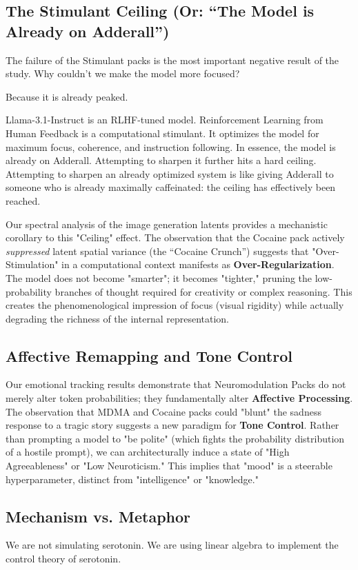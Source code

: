 \documentclass[10pt]{article}
\begin{document}
\subsection{The Stimulant Ceiling (Or: ``The Model is Already on Adderall'')}
The failure of the Stimulant packs is the most important negative result of the study. Why couldn't we make the model more focused?

Because it is already peaked.

Llama-3.1-Instruct is an RLHF-tuned model. Reinforcement Learning from Human Feedback is a computational stimulant. It optimizes the model for maximum focus, coherence, and instruction following. In essence, the model is already on Adderall. Attempting to sharpen it further hits a hard ceiling. Attempting to sharpen an already optimized system is like giving Adderall to someone who is already maximally caffeinated: the ceiling has effectively been reached.

Our spectral analysis of the image generation latents provides a mechanistic corollary to this "Ceiling" effect. The observation that the Cocaine pack actively \textit{suppressed} latent spatial variance (the ``Cocaine Crunch'') suggests that "Over-Stimulation" in a computational context manifests as \textbf{Over-Regularization}. The model does not become "smarter"; it becomes "tighter," pruning the low-probability branches of thought required for creativity or complex reasoning. This creates the phenomenological impression of focus (visual rigidity) while actually degrading the richness of the internal representation.

\subsection{Affective Remapping and Tone Control}
Our emotional tracking results demonstrate that Neuromodulation Packs do not merely alter token probabilities; they fundamentally alter \textbf{Affective Processing}.
The observation that MDMA and Cocaine packs could "blunt" the sadness response to a tragic story suggests a new paradigm for \textbf{Tone Control}. Rather than prompting a model to "be polite" (which fights the probability distribution of a hostile prompt), we can architecturally induce a state of "High Agreeableness" or "Low Neuroticism."
This implies that "mood" is a steerable hyperparameter, distinct from "intelligence" or "knowledge."

\subsection{Mechanism vs. Metaphor}
We are not simulating serotonin. We are using linear algebra to implement the control theory of serotonin.
\end{document}
